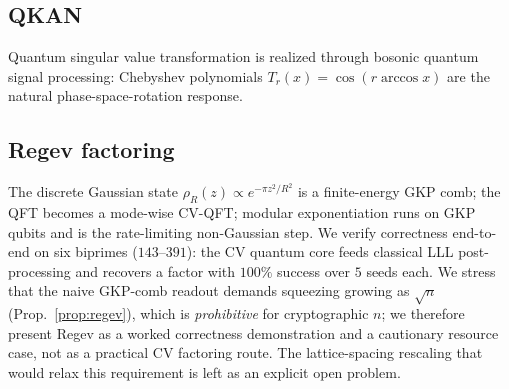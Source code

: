 \documentclass[aps,prxquantum,reprint,superscriptaddress,nofootinbib]{revtex4-2}
\begin{document}
\subsection{QKAN}
Quantum singular value transformation is realized through bosonic quantum
signal processing: Chebyshev polynomials $T_r(x)=\cos(r\arccos x)$ are the
natural phase-space-rotation response.

\subsection{Regev factoring}
The discrete Gaussian state $\rho_R(z)\propto e^{-\pi z^2/R^2}$ is a
finite-energy GKP comb; the QFT becomes a mode-wise CV-QFT; modular
exponentiation runs on GKP qubits and is the rate-limiting non-Gaussian step.
We verify correctness end-to-end on six biprimes ($143$--$391$): the CV
quantum core feeds classical LLL post-processing and recovers a factor with
$100\%$ success over $5$ seeds each. We stress that the naive GKP-comb readout
demands squeezing growing as $\sqrt{n}$ (Prop.~\ref{prop:regev}), which is
\emph{prohibitive} for cryptographic $n$; we therefore present Regev as a
worked correctness demonstration and a cautionary resource case, not as a
practical CV factoring route. The lattice-spacing rescaling that would relax
this requirement is left as an explicit open problem.
\end{document}
